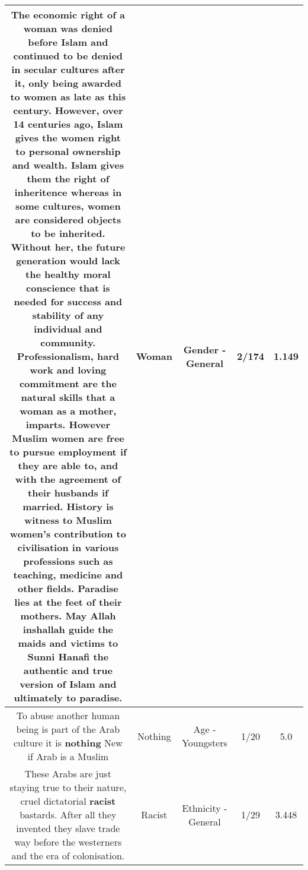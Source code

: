 \documentclass[11pt]{article}
\newlength\mylength
\begin{document}
\begin{center}
\begin{longtable}{|C{.65\mylength}|C{.30\mylength}|C{.12\mylength}|C{.12\mylength}|C{.12\mylength}|}
  \small The economic right of a \textbf{woman} was denied before Islam and continued to be denied in secular cultures after it, only being awarded to women as late as this century. However, over 14 centuries ago, Islam gives the women right to personal ownership and wealth. Islam gives them the right of inheritence whereas in some cultures, women are considered objects to be inherited. Without her, the future generation would lack the healthy moral conscience that is needed for success and stability of any individual and community. Professionalism, hard work and loving commitment are the natural skills that a \textbf{woman} as a mother, imparts. However Muslim women are free to pursue employment if they are able to, and with the agreement of their husbands if married. History is witness to Muslim women's contribution to civilisation in various professions such as teaching, medicine and other fields. Paradise lies at the feet of their mothers. May Allah inshallah guide the maids and victims to Sunni Hanafi the authentic and true version of Islam and ultimately to paradise.\normalsize   & Woman & Gender - General & 2/174 & 1.149 \\  \hline
  \small To abuse another human being is part of the Arab culture it is \textbf{nothing} New if Arab is a Muslim\normalsize   & Nothing & Age - Youngsters & 1/20 & 5.0 \\  \hline
  \small These Arabs are just staying true to their nature, cruel dictatorial \textbf{racist} bastards. After all they invented they slave trade way before the westerners and the era of colonisation.\normalsize   & Racist & Ethnicity - General & 1/29 & 3.448 \\  \hline

\end{longtable}
\end{center}
\end{document}
